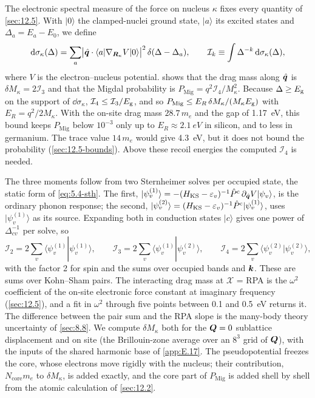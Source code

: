 The electronic spectral measure of the force on nucleus $\kappa$ fixes every quantity of \cref{sec:12.5}. With $|0\rangle$ the clamped-nuclei ground state, $|a\rangle$ its excited states and $\Delta_a = E_a - E_0$, we define
\begin{equation}
  \mathrm{d}\sigma_\kappa(\Delta) = \sum_a \bigl|\hat{\bm{q}}\cdot\langle a|\nabla_{\bm{R}_\kappa}V|0\rangle\bigr|^2\,\delta(\Delta - \Delta_a) ,
  \qquad
  \mathcal{I}_k \equiv \int \Delta^{-k}\,\mathrm{d}\sigma_\kappa(\Delta) ,
  \label{eq:E.18-moments}
\end{equation}
where $V$ is the electron--nucleus potential.  shows that the drag mass along $\hat{\bm{q}}$ is $\delta M_\kappa = 2\mathcal{I}_3$ and that the Migdal probability is $P_{\mathrm{Mig}} = q^2\mathcal{I}_4/M_\kappa^2$. Because $\Delta \ge E_{\mathrm{g}}$ on the support of $\dd\sigma_\kappa$, $\mathcal{I}_4 \le \mathcal{I}_3/E_{\mathrm{g}}$, and so $P_{\mathrm{Mig}} \le E_R\,\delta M_\kappa/(M_\kappa E_{\mathrm{g}})$ with $E_R = q^2/2M_\kappa$. With the on-site drag mass $28.7\,m_e$ and the gap of \SI{1.17}{eV}, this bound keeps $P_{\mathrm{Mig}}$ below $10^{-3}$ only up to $E_R \approx \SI{2.1}{eV}$ in silicon, and to less in germanium. The trace value $14\,m_e$ would give \SI{4.3}{eV}, but it does not bound the probability (\cref{sec:12.5-bounds}). Above these recoil energies the computed $\mathcal{I}_4$ is needed.

The three moments follow from two Sternheimer solves per occupied state, the static form of \cref{eq:5.4-sth}. The first, $|\psi^{(1)}_v\rangle = -(H_{\mathrm{KS}} - \varepsilon_v)^{-1}\hat{P}^{\mathrm{c}}\,\partial_{\hat{\bm{q}}}V|\psi_v\rangle$, is the ordinary phonon response; the second, $|\psi^{(2)}_v\rangle = (H_{\mathrm{KS}} - \varepsilon_v)^{-1}\hat{P}^{\mathrm{c}}|\psi^{(1)}_v\rangle$, uses $|\psi^{(1)}_v\rangle$ as its source. Expanding both in conduction states $|c\rangle$ gives one power of $\Delta_{cv}^{-1}$ per solve, so
\begin{equation}
  \mathcal{I}_2 = 2\sum_v\langle\psi^{(1)}_v|\psi^{(1)}_v\rangle , \qquad
  \mathcal{I}_3 = 2\sum_v\langle\psi^{(1)}_v|\psi^{(2)}_v\rangle , \qquad
  \mathcal{I}_4 = 2\sum_v\langle\psi^{(2)}_v|\psi^{(2)}_v\rangle ,
  \label{eq:E.18-sth}
\end{equation}
with the factor 2 for spin and the sums over occupied bands and $\bm{k}$. These are sums over Kohn--Sham pairs. The interacting drag mass at $\mathcal{X}$ = RPA is the $\omega^2$ coefficient of the on-site electronic force constant at imaginary frequency (\cref{sec:12.5}), and a fit in $\omega^2$ through five points between 0.1 and \SI{0.5}{eV} returns it. The difference between the pair sum and the RPA slope is the many-body theory uncertainty of \cref{sec:8.8}. We compute $\delta M_\kappa$ both for the $\bm{Q} = 0$ sublattice displacement and on site (the Brillouin-zone average over an $8^3$ grid of $\bm{Q}$), with the inputs of the shared harmonic base of \cref{app:E.17}. The pseudopotential freezes the core, whose electrons move rigidly with the nucleus; their contribution, $N_{\mathrm{core}}m_e$ to $\delta M_\kappa$, is added exactly, and the core part of $P_{\mathrm{Mig}}$ is added shell by shell from the atomic calculation of \cref{sec:12.2}.

